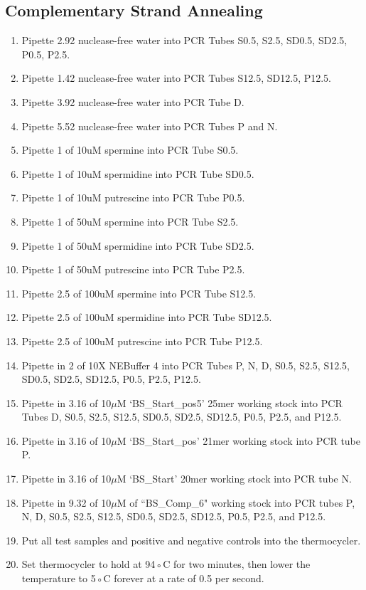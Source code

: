 \documentclass{ssiBio}
\begin{document}
\subsection{Complementary Strand Annealing}
\begin{enumerate}
\item{Pipette 2.92\uL{} nuclease-free water into PCR Tubes S0.5, S2.5, SD0.5, SD2.5, P0.5, P2.5.}
\item{Pipette 1.42\uL{} nuclease-free water into PCR Tubes S12.5, SD12.5, P12.5.}
\item{Pipette 3.92 \uL{} nuclease-free water into PCR Tube D.}
\item{Pipette 5.52 \uL{} nuclease-free water into PCR Tubes P and N.}

\item{Pipette 1\uL{} of 10uM spermine into PCR Tube S0.5.}
\item{Pipette 1\uL{} of 10uM spermidine into PCR Tube SD0.5.}
\item{Pipette 1\uL{} of 10uM putrescine into PCR Tube P0.5.}

\item{Pipette 1\uL{} of 50uM spermine into PCR Tube S2.5.}
\item{Pipette 1\uL{} of 50uM spermidine into PCR Tube SD2.5.}
\item{Pipette 1\uL{} of 50uM putrescine into PCR Tube P2.5.}

\item{Pipette 2.5\uL{} of 100uM spermine into PCR Tube S12.5.}
\item{Pipette 2.5\uL{} of 100uM spermidine into PCR Tube SD12.5.}
\item{Pipette 2.5\uL{} of 100uM putrescine into PCR Tube P12.5.}

\item{Pipette in 2\uL{} of 10X NEBuffer 4 into PCR Tubes P, N, D, S0.5, S2.5, S12.5, SD0.5, SD2.5, SD12.5, P0.5, P2.5, P12.5.}
\item{Pipette in 3.16\uL{} of 10$\mu$M `BS\_Start\_pos5' 25mer working stock into PCR Tubes D, S0.5, S2.5, S12.5, SD0.5, SD2.5, SD12.5, P0.5, P2.5, and P12.5.}
\item{Pipette in 3.16\uL{} of 10$\mu$M `BS\_Start\_pos' 21mer working stock into PCR tube P.}
\item{Pipette in 3.16\uL{} of 10$\mu$M `BS\_Start' 20mer working stock into PCR tube N.}
\item{Pipette in 9.32\uL{} of 10$\mu$M of ``BS\_Comp\_6" working stock into PCR tubes P, N, D, S0.5, S2.5, S12.5, SD0.5, SD2.5, SD12.5, P0.5, P2.5, and P12.5.}
\item{Put all test samples and positive and negative controls into the thermocycler.}
\item{Set thermocycler to hold at 94◦C for two minutes, then lower the temperature to 5◦C forever at a rate of 0.5\C{} per second.}
\end{enumerate}
\end{document}
